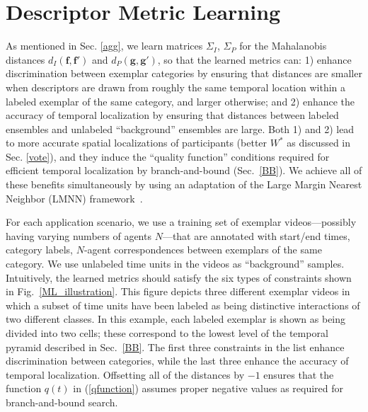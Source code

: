 
\section{Descriptor Metric Learning}
\label{MetLearn}
\vspace{-5pt}
As mentioned in Sec. \ref{agg}, we learn matrices $\Sigma_{I}$, $\Sigma_{P}$ for the Mahalanobis distances $d_I(\mathbf{f},\mathbf{f}')$ and $d_P(\mathbf{g},\mathbf{g}')$, so that the learned metrics can: 1) enhance discrimination between exemplar categories by ensuring that distances are smaller when descriptors are drawn from roughly the same temporal location within a labeled exemplar of the same category, and larger otherwise; and 2) enhance the accuracy of temporal localization by ensuring that distances between labeled ensembles and unlabeled ``background'' ensembles are large. Both 1) and 2) lead to more accurate spatial localizations of participants (\ie better $W^{*}$ as discussed in Sec. \ref{vote}), and they induce the ``quality function'' conditions required for efficient temporal localization by branch-and-bound (Sec.~\ref{BB}). We achieve all of these benefits simultaneously by using an adaptation of the Large Margin Nearest Neighbor (LMNN) framework~\cite{Weinberger:ML}. 

For each application scenario, we use a training set of exemplar videos---possibly having varying numbers of agents $N$---that are annotated with start/end times, category labels, $N$-agent correspondences between exemplars of the same category. We use unlabeled time units in the videos as ``background'' samples. Intuitively, the learned metrics should satisfy the six types of constraints shown in Fig.~\ref{ML_illustration}. This figure depicts three different exemplar videos in which a subset of time units have been labeled as being distinctive interactions of two different classes. In this example, each labeled exemplar is shown as being divided into two cells; these correspond to the lowest level of the temporal pyramid described in Sec.~\ref{BB}. The first three constraints in the list enhance discrimination between categories, while the last three enhance the accuracy of temporal localization. Offsetting all of the distances by $-1$ ensures that the function $q(t)$ in (\ref{qfunction}) assumes proper negative values as required for branch-and-bound search. 

